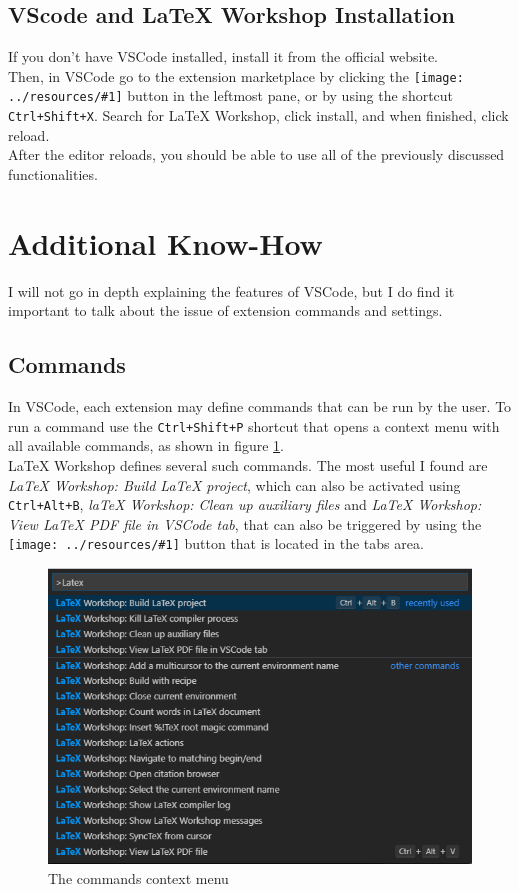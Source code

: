 \documentclass{article}
\newcommand{\latex}{\LaTeX\xspace}
\newcommand{\icon}[2]{\texttt{[image: ../resources/\#1]}\xspace}
\begin{document}
\subsection{VScode and \latex Workshop Installation}
If you don't have VSCode installed, install it from the official website.\\
Then, in VSCode go to the extension marketplace by clicking the \icon{extensions_icon.png}{0.4} button in the leftmost pane, or by using the shortcut \texttt{Ctrl+Shift+X}. Search for \latex Workshop, click install, and when finished, click reload.\\
After the editor reloads, you should be able to use all of the previously discussed functionalities.


\section{Additional Know-How} \label{sec:additional_know_how}
I will not go in depth explaining the features of VSCode, but I do find it important to talk about the issue of extension commands and settings.

\subsection{Commands}
In VSCode, each extension may define commands that can be run by the user. To run a command use the \texttt{Ctrl+Shift+P} shortcut that opens a context menu with all available commands, as shown in figure \ref{fig:command_menu}.\\
\latex Workshop defines several such commands. The most useful I found are \emph{LaTeX Workshop: Build LaTeX project}, which can also be activated using \texttt{Ctrl+Alt+B}, \emph{laTeX Workshop: Clean up auxiliary files} and \emph{LaTeX Workshop: View LaTeX PDF file in VSCode tab}, that can also be triggered by using the \icon{preview_icon.png}{0.5} button that is located in the tabs area.
\begin{figure}
	\includegraphics[width=\linewidth]{../resources/command_menu.png}
	\caption{The commands context menu}
	\label{fig:command_menu}
\end{figure}
\end{document}
